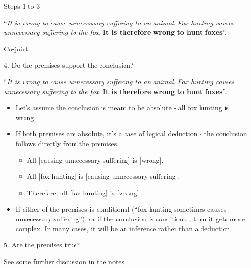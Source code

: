 \documentclass{beamer}
\begin{document}

\begin{frame}{Steps 1 to 3}

``\emph{It is wrong to cause unnecessary suffering to an animal}. \emph{Fox hunting causes unnecessary suffering to the fox}. \textbf{It is therefore wrong to hunt foxes}''.

\vspace{12pt}
Co-joint.

\end{frame}



\begin{frame}{4. Do the premises support the conclusion?}

``\emph{It is wrong to cause unnecessary suffering to an animal}. \emph{Fox hunting causes unnecessary suffering to the fox}. \textbf{It is therefore wrong to hunt foxes}''.

\begin{itemize}
	\item Let's assume the conclusion is meant to be absolute - all fox hunting is wrong.
	\item If both premises are absolute, it's a case of logical deduction - the conclusion follows directly from the premises.
	\begin{itemize}
		\item All [causing-unnecessary-suffering] is [wrong].
		\item All [fox-hunting] is [causing-unnecessary-suffering].
		\item Therefore, all [fox-hunting] is [wrong]
	\end{itemize}
	\item If either of the premises is conditional (``fox hunting sometimes causes unnecessary suffering''), or if the conclusion is conditional, then it gets more complex. In many cases, it will be an inference rather than a deduction. 
\end{itemize}
\end{frame}

\begin{frame}{5. Are the premises true?}

See some further discussion in the notes.
	
\end{frame}
\end{document}
